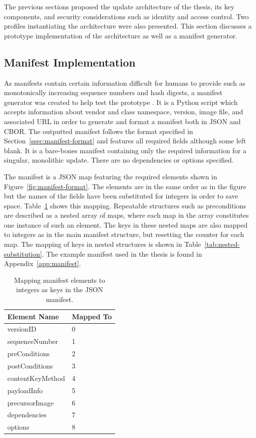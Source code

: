 \documentclass[0-thesis.tex]{subfiles}
\begin{document}
The previous sections proposed the update architecture of the thesis, its key components,
and security considerations such as identity and access control. Two profiles
instantiating the architecture were also presented. This section discusses a prototype
implementation of the architecture as well as a manifest generator. 

\subsection{Manifest Implementation}
\label{ssec:manifest-implementation}
As manifests contain certain information difficult for humans to provide such as
monotonically increasing sequence numbers and hash digests, a manifest generator was
created to help test the prototype \parencite{manifest-generator}. It is a Python script
which accepts information about vendor and class namespace, version, image file, and
associated URL in order to generate and format a manifest both in JSON and CBOR. The
outputted manifest follows the format specified in Section~\ref{ssec:manifest-format} and
features all required fields although some left blank. It is a bare-bones manifest
containing only the required information for a singular, monolithic update. There are no
dependencies or options specified.

The manifest is a JSON map featuring the required elements shown in
Figure~\ref{fig:manifest-format}. The elements are in the same order as in the figure but
the names of the fields have been substituted for integers in order to save space.
Table~\ref{tab:manifest-substitution} shows this mapping. Repeatable structures such as
preconditions are described as a nested array of maps, where each map in the array
constitutes one instance of such an element. The keys in these nested maps are also mapped
to integers as in the main manifest structure, but resetting the counter for each map. The
mapping of keys in nested structures is shown in Table~\ref{tab:nested-substitution}. The
example manifest used in the thesis is found in Appendix~\ref{app:manifest}. 

\begin{longtable}[]{@{}ll@{}}
    \caption{Mapping manifest elements to integers as keys in the JSON manifest.}
    \label{tab:manifest-substitution}\\
    \toprule
    Element Name & Mapped To\tabularnewline
    \midrule
    \endhead
    versionID & 0\tabularnewline
    sequenceNumber & 1\tabularnewline
    preConditions & 2\tabularnewline
    postConditions & 3\tabularnewline
    contentKeyMethod & 4\tabularnewline
    payloadInfo & 5\tabularnewline
    precursorImage & 6\tabularnewline
    dependencies & 7\tabularnewline
    options & 8\tabularnewline
    \bottomrule
\end{longtable}
\end{document}
